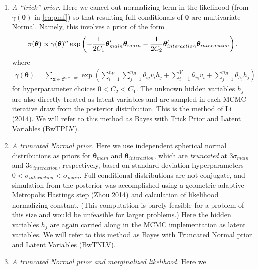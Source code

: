 \documentclass[AMS,STIX1COL]{WileyNJD-v2}
\newcommand{\nv}{{n_{\scriptscriptstyle V}}}
\newcommand{\nh}{{n_{\scriptscriptstyle H}}}
\providecommand{\tightlist}{%
  \setlength{\itemsep}{0pt}\setlength{\parskip}{0pt}}
\begin{document}
\begin{enumerate}
\def\labelenumi{\arabic{enumi}.}
\tightlist
\item
  \emph{A ``trick'' prior.} Here we cancel out normalizing term in the
  likelihood (from \(\gamma(\boldsymbol \theta)\) in \eqref{eq:pmf}) so
  that resulting full conditionals of \(\boldsymbol \theta\) are
  multivariate Normal. Namely, this involves a prior of the form
  \begin{align*}
   \pi(\boldsymbol \theta) \propto \gamma(\boldsymbol \theta)^n \exp\left(-\frac{1}{2C_{1}}\boldsymbol \theta_{main}'\boldsymbol \theta_{main} -\frac{1}{2C_{2}}\boldsymbol \theta_{interaction}'\boldsymbol \theta_{interaction}\right), \vspace{-.75cm}
   \end{align*} where \begin{align*}
   \gamma(\boldsymbol \theta) = \sum\limits_{\boldsymbol x \in \mathcal{C}^{\nh + \nv}}\exp\left(\sum\limits_{i = 1}^\nv\sum\limits_{j=1}^\nh \theta_{ij} v_i h_j + \sum\limits_{i = 1}^V\theta_{v_i} v_i + \sum\limits_{j = 1}^\nh\theta_{h_j} h_j\right) 
   \end{align*} for hyperparameter choices \(0< C_2 < C_1\). The unknown
  hidden variables \(h_j\) are also directly treated as latent variables
  and are sampled in each MCMC iterative draw from the posterior
  distribution. This is the method of Li (2014). We will refer to this
  method as Bayes with Trick Prior and Latent Variables (BwTPLV).
\item
  \emph{A truncated Normal prior.} Here we use independent spherical
  normal distributions as priors for \(\boldsymbol \theta_{main}\) and
  \(\boldsymbol \theta_{interaction}\), which are \emph{truncated} at
  \(3\sigma_{main}\) and \(3\sigma_{interaction}\), respectively, based
  on standard deviation hyperparameters
  \(0<\sigma_{interaction}<\sigma_{main}\). Full conditional
  distributions are not conjugate, and simulation from the posterior was
  accomplished using a geometric adaptive Metropolis Hastings step (Zhou
  2014) and calculation of likelihood normalizing constant. (This
  computation is barely feasible for a problem of this size and would be
  unfeasible for larger problems.) Here the hidden variables \(h_j\) are
  again carried along in the MCMC implementation as latent variables. We
  will refer to this method as Bayes with Truncated Normal prior and
  Latent Variables (BwTNLV).
\item
  \emph{A truncated Normal prior and marginalized likelihood.} Here we

\end{enumerate}
\end{document}
